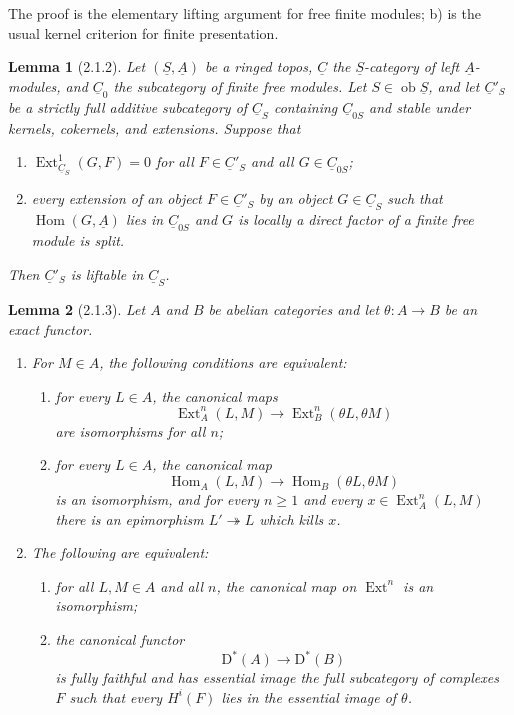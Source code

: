 \documentclass[13pt]{extarticle}
\newcommand{\uS}{\underline S}
\newcommand{\uC}{\underline C}
\newcommand{\uA}{\underline A}
\newcommand{\D}{\mathrm D}
\newcommand{\Hom}{\operatorname{Hom}}
\newcommand{\Ext}{\operatorname{Ext}}
\newcommand{\ob}{\operatorname{ob}}
\newtheorem*{lemma*}{Lemma}
\begin{document}
The proof is the elementary lifting argument for free finite modules; b) is the usual kernel criterion for finite presentation.

\begin{lemma*}[2.1.2]
Let $(\uS,\uA)$ be a ringed topos, $\uC$ the $\uS$-category of left $\uA$-modules, and $\uC_0$ the subcategory of finite free modules. Let $S\in\ob\uS$, and let $\uC'_S$ be a strictly full additive subcategory of $\uC_S$ containing $\uC_{0S}$ and stable under kernels, cokernels, and extensions. Suppose that
\begin{enumerate}[label=(\roman*)]
\item $\Ext^1_{\uC_S}(G,F)=0$ for all $F\in\uC'_S$ and all $G\in\uC_{0S}$;
\item every extension of an object $F\in\uC'_S$ by an object $G\in\uC_S$ such that $\Hom(G,\uA)$ lies in $\uC_{0S}$ and $G$ is locally a direct factor of a finite free module is split.
\end{enumerate}
Then $\uC'_S$ is liftable in $\uC_S$.
\end{lemma*}

\begin{lemma*}[2.1.3]
Let $A$ and $B$ be abelian categories and let $\theta:A\to B$ be an exact functor.
\begin{enumerate}[label=\alph*)]
\item For $M\in A$, the following conditions are equivalent:
\begin{enumerate}[label=(\roman*)]
\item for every $L\in A$, the canonical maps
\[
\Ext_A^n(L,M)\longrightarrow \Ext_B^n(\theta L,\theta M)
\]
are isomorphisms for all $n$;
\item for every $L\in A$, the canonical map
\[
\Hom_A(L,M)\longrightarrow \Hom_B(\theta L,\theta M)
\]
is an isomorphism, and for every $n\ge1$ and every $x\in\Ext_A^n(L,M)$ there is an epimorphism $L'\twoheadrightarrow L$ which kills $x$.
\end{enumerate}
\item The following are equivalent:
\begin{enumerate}[label=(\roman*)]
\item for all $L,M\in A$ and all $n$, the canonical map on $\Ext^n$ is an isomorphism;
\item the canonical functor
\[
\D^*(A)\longrightarrow \D^*(B)
\]
is fully faithful and has essential image the full subcategory of complexes $F$ such that every $H^i(F)$ lies in the essential image of $\theta$.
\end{enumerate}
\end{enumerate}
\end{lemma*}
\end{document}
